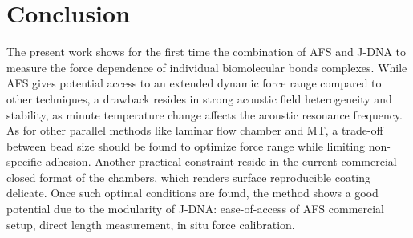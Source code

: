 \documentclass{biophys-new}
\begin{document}
%
%
%

\section*{Conclusion}

The present work shows for the first time the combination of AFS and J-DNA to measure the force dependence of individual biomolecular bonds complexes. While AFS gives potential access to an extended dynamic force range compared to other techniques, a drawback resides in strong acoustic field heterogeneity and stability, as minute temperature change affects the acoustic resonance frequency. As for other parallel methods like laminar flow chamber and MT, a trade-off between bead size should be found to optimize force range while limiting non-specific adhesion. Another practical constraint reside in the current commercial closed format of the chambers, which renders surface reproducible coating delicate. Once such optimal conditions are found, the method shows a good potential due to the modularity of J-DNA: ease-of-access of AFS commercial setup, direct length measurement, in situ force calibration.
\end{document}
